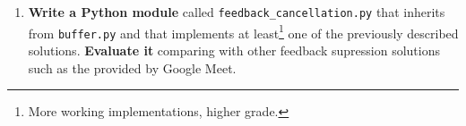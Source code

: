 \begin{enumerate}
\item
\textbf{Write a Python module} called \texttt{feedback\_cancellation.py} that inherits
from \texttt{buffer.py} and that implements at least\footnote{More
  working implementations, higher grade.} one of the previously
described solutions.
\textbf{Evaluate it} comparing with other feedback supression solutions such as the provided by Google Meet.
\end{enumerate}

\begin{comment}
More concretely:

\begin{enumerate}

\item If you implement the ``$s(t)$ delay and subtract solution'',
  you must estimate $a$, $d$ and perform the signals subtraction to
  remove the feedback signal ($s(t)$). 

\item In a ``$s(t)$ delay and subtract solution'', if you also
  consider the frequency response of the near-end audioset to estimate
  a better feedback signal, first you will need to find ${\mathbf H}$ (the
  discrete frequency response of your audioset). For this, the
  near-end speaker should generate an impulse signal
  ${\mathbf \delta}$, and in absence of any other sound signal, record
  the echo and compute its Fourier transform (it is a good idea to
  repeat this process several times to obtain a better estimation of
  ${\mathbf H}$). Finally, .

  Notice that the frequency characterization of the far-end audioset
  can be also used in a ``$n(t)$ delay and subtract
  solution''. Remember that filtering operations must be implemented
  with convolutions in the temporal domain, but are dot products in
  the frequency domain.
  
\item Use LMS to find a estimation of the echo signal and perform the
  echo cancellation. In this case, consider the use of a thread to
  compute the coefficients of the LMS filter
  (Equation~\eqref{eq:update} can run with a cadence much higher than
  a sample-time) and compute the estimated feedback signal
  (Equation~\eqref{eq:LMS_feedback}) for every chunk. Notice that for
  doing that, we will require the first $k$ samples of the next chunk.

\item 
\end{enumerate}


\end{comment}
